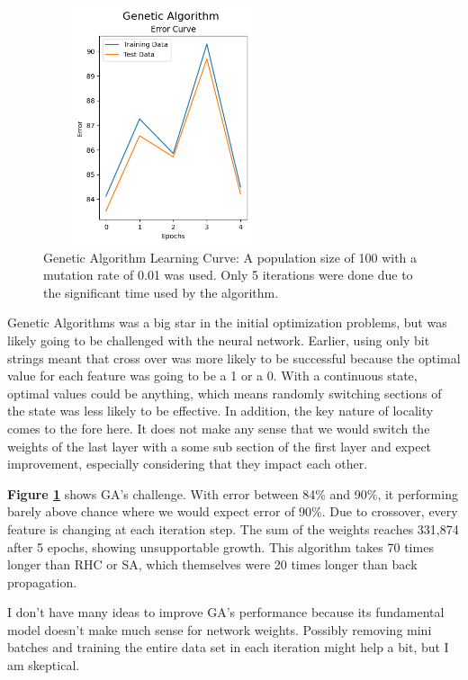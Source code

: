 \documentclass[letterpaper]{article} %
\begin{document}
\begin{figure}[!htb]
\centering
\includegraphics[width=2.75in, height=2.75in]{figures/Genetic_Algorithm__algorithm_ga_epochs_5_max_iters_3_max_attempts_3_seed_1_.png}
\caption{Genetic Algorithm Learning Curve:  A population size of 100 with a mutation rate of 0.01 was used.  Only 5 iterations were done due to the significant time used by the algorithm.  }
\label{fig:nn_ga}
\end{figure}

Genetic Algorithms was a big star in the initial optimization problems, but was likely going to be challenged with the neural network.  Earlier, using only bit strings meant that cross over was more likely to be successful because the optimal value for each feature was going to be a 1 or a 0.  With a continuous state, optimal values could be anything, which means randomly switching sections of the state was less likely to be effective.  In addition, the key nature of locality comes to the fore here.  It does not make any sense that we would switch the weights of the last layer with a some sub section of the first layer and expect improvement, especially considering that they impact each other. 

 \textbf{Figure \ref{fig:nn_ga}} shows GA's challenge.   With error between 84\% and 90\%, it performing barely above chance where we would expect error of 90\%.  Due to crossover, every feature is changing at each iteration step.   The sum of the weights reaches 331,874 after 5 epochs, showing unsupportable growth.  This algorithm takes 70 times longer than RHC or SA, which themselves were 20 times longer than back propagation.
 
I don't have many ideas to improve GA's performance because its fundamental model doesn't make much sense for network weights.  Possibly removing mini batches and training the entire data set in each iteration might help a bit, but I am skeptical.
\end{document}
